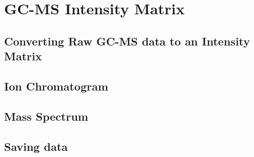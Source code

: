 

\chapter{GC-MS Intensity Matrix}



\section{Converting Raw GC-MS data to an Intensity Matrix}



\section{Ion Chromatogram}

\section{Mass Spectrum}

\section{Saving data}


